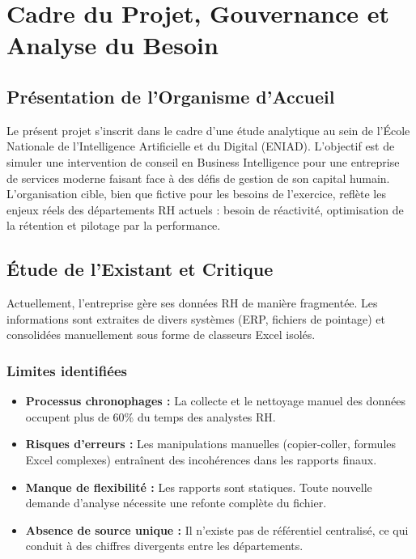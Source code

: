 \chapter{Cadre du Projet, Gouvernance et Analyse du Besoin}

\section{Présentation de l'Organisme d'Accueil}
Le présent projet s'inscrit dans le cadre d'une étude analytique au sein de l'École Nationale de l'Intelligence Artificielle et du Digital (ENIAD). L'objectif est de simuler une intervention de conseil en Business Intelligence pour une entreprise de services moderne faisant face à des défis de gestion de son capital humain. L'organisation cible, bien que fictive pour les besoins de l'exercice, reflète les enjeux réels des départements RH actuels : besoin de réactivité, optimisation de la rétention et pilotage par la performance.

\section{Étude de l'Existant et Critique}
Actuellement, l'entreprise gère ses données RH de manière fragmentée. Les informations sont extraites de divers systèmes (ERP, fichiers de pointage) et consolidées manuellement sous forme de classeurs Excel isolés.

\subsection{Limites identifiées}
\begin{itemize}
    \item \textbf{Processus chronophages :} La collecte et le nettoyage manuel des données occupent plus de 60\% du temps des analystes RH.
    \item \textbf{Risques d'erreurs :} Les manipulations manuelles (copier-coller, formules Excel complexes) entraînent des incohérences dans les rapports finaux.
    \item \textbf{Manque de flexibilité :} Les rapports sont statiques. Toute nouvelle demande d'analyse nécessite une refonte complète du fichier.
    \item \textbf{Absence de source unique :} Il n'existe pas de référentiel centralisé, ce qui conduit à des chiffres divergents entre les départements.
\end{itemize}

